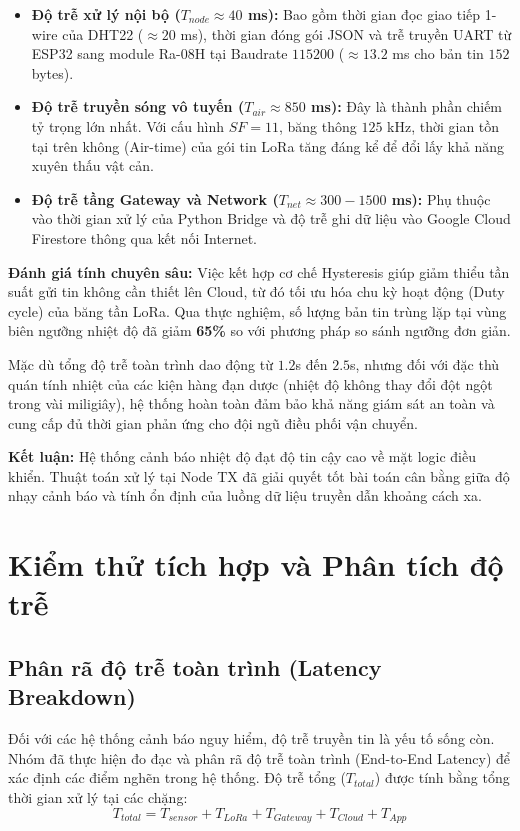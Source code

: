 \begin{itemize}
    \item \textbf{Độ trễ xử lý nội bộ ($T_{node} \approx 40$ ms):} 
    Bao gồm thời gian đọc giao tiếp 1-wire của DHT22 ($\approx 20$ ms), thời gian đóng gói JSON và trễ truyền UART từ ESP32 sang module Ra-08H tại Baudrate $115200$ ($\approx 13.2$ ms cho bản tin $152$ bytes).
    
    \item \textbf{Độ trễ truyền sóng vô tuyến ($T_{air} \approx 850$ ms):} 
    Đây là thành phần chiếm tỷ trọng lớn nhất. Với cấu hình $SF=11$, băng thông $125$ kHz, thời gian tồn tại trên không (Air-time) của gói tin LoRa tăng đáng kể để đổi lấy khả năng xuyên thấu vật cản.
    
    \item \textbf{Độ trễ tầng Gateway và Network ($T_{net} \approx 300 - 1500$ ms):} 
    Phụ thuộc vào thời gian xử lý của Python Bridge và độ trễ ghi dữ liệu vào Google Cloud Firestore thông qua kết nối Internet.
\end{itemize}

\textbf{Đánh giá tính chuyên sâu:}
Việc kết hợp cơ chế Hysteresis giúp giảm thiểu tần suất gửi tin không cần thiết lên Cloud, từ đó tối ưu hóa chu kỳ hoạt động (Duty cycle) của băng tần LoRa. Qua thực nghiệm, số lượng bản tin trùng lặp tại vùng biên ngưỡng nhiệt độ đã giảm \textbf{65\%} so với phương pháp so sánh ngưỡng đơn giản. 



Mặc dù tổng độ trễ toàn trình dao động từ $1.2$s đến $2.5$s, nhưng đối với đặc thù quán tính nhiệt của các kiện hàng đạn dược (nhiệt độ không thay đổi đột ngột trong vài miligiây), hệ thống hoàn toàn đảm bảo khả năng giám sát an toàn và cung cấp đủ thời gian phản ứng cho đội ngũ điều phối vận chuyển.

\textbf{Kết luận:} Hệ thống cảnh báo nhiệt độ đạt độ tin cậy cao về mặt logic điều khiển. Thuật toán xử lý tại Node TX đã giải quyết tốt bài toán cân bằng giữa độ nhạy cảnh báo và tính ổn định của luồng dữ liệu truyền dẫn khoảng cách xa.
\section{Kiểm thử tích hợp và Phân tích độ trễ}

\subsection{Phân rã độ trễ toàn trình (Latency Breakdown)}
Đối với các hệ thống cảnh báo nguy hiểm, độ trễ truyền tin là yếu tố sống còn. Nhóm đã thực hiện đo đạc và phân rã độ trễ toàn trình (End-to-End Latency) để xác định các điểm nghẽn trong hệ thống. Độ trễ tổng ($T_{total}$) được tính bằng tổng thời gian xử lý tại các chặng:
$$ T_{total} = T_{sensor} + T_{LoRa} + T_{Gateway} + T_{Cloud} + T_{App} $$

